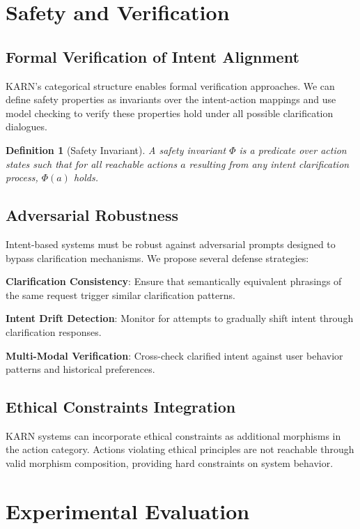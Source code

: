 \documentclass[12pt]{article}
\newtheorem{definition}{Definition}
\begin{document}
\section{Safety and Verification}

\subsection{Formal Verification of Intent Alignment}

KARN's categorical structure enables formal verification approaches. We can define safety properties as invariants over the intent-action mappings and use model checking to verify these properties hold under all possible clarification dialogues.

\begin{definition}[Safety Invariant]
A safety invariant $\Phi$ is a predicate over action states such that for all reachable actions $a$ resulting from any intent clarification process, $\Phi(a)$ holds.
\end{definition}

\subsection{Adversarial Robustness}

Intent-based systems must be robust against adversarial prompts designed to bypass clarification mechanisms. We propose several defense strategies:

\textbf{Clarification Consistency}: Ensure that semantically equivalent phrasings of the same request trigger similar clarification patterns.

\textbf{Intent Drift Detection}: Monitor for attempts to gradually shift intent through clarification responses.

\textbf{Multi-Modal Verification}: Cross-check clarified intent against user behavior patterns and historical preferences.

\subsection{Ethical Constraints Integration}

KARN systems can incorporate ethical constraints as additional morphisms in the action category. Actions violating ethical principles are not reachable through valid morphism composition, providing hard constraints on system behavior.

\section{Experimental Evaluation}
\end{document}
